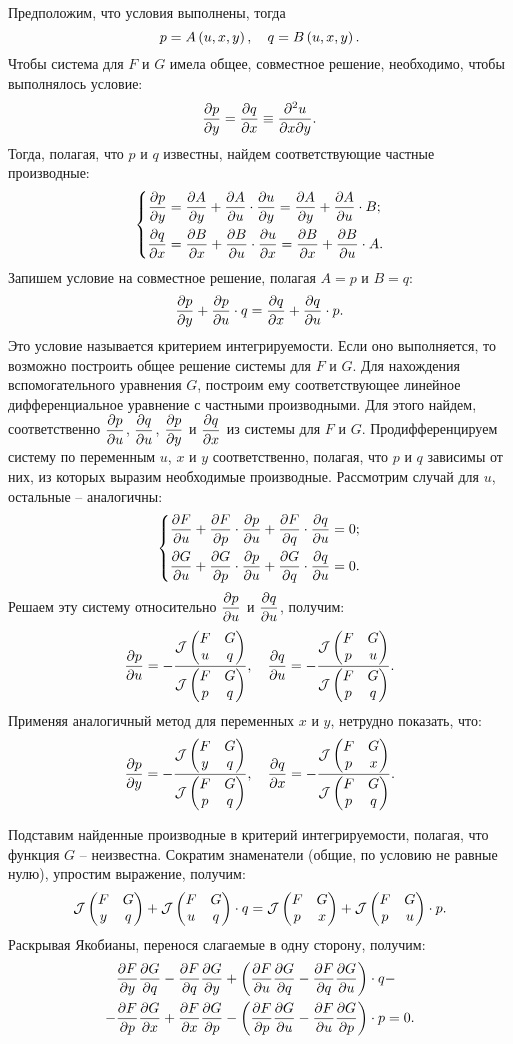 	Предположим, что условия выполнены, тогда
	\[ p = A \pares{u, x, y}, \quad q = B \pares{u, x, y}. \]
	Чтобы система для $F$ и $G$ имела общее, совместное решение, необходимо, чтобы выполнялось условие:
	\[ \dpart{p}{y} = \dpart{q}{x} \equiv \dpartmix{u}{x}{y}. \]
	Тогда, полагая, что $p$ и $q$ известны, найдем соответствующие частные производные:
	\[ \left\lbrace \begin{split} 
		\dpart{p}{y} &= \dpart{A}{y} + \dpart{A}{u} \cdot \dpart{u}{y} = \dpart{A}{y} + \dpart{A}{u} \cdot B; \\
		\dpart{q}{x} &= \dpart{B}{x} + \dpart{B}{u} \cdot \dpart{u}{x} = \dpart{B}{x} + \dpart{B}{u} \cdot A.
	\end{split} \right. \]
	Запишем условие на совместное решение, полагая $A = p$ и $B = q$:
	\[ \dpart{p}{y} + \dpart{p}{u} \cdot q = \dpart{q}{x} + \dpart{q}{u} \cdot p. \]
	Это условие называется критерием интегрируемости. Если оно выполняется, то возможно построить общее решение системы для $F$ и $G$. Для нахождения вспомогательного уравнения $G$, построим ему соответствующее линейное дифференциальное уравнение с частными производными. Для этого найдем, соответственно $\dpart{p}{u}$, $\dpart{q}{u}$, $\dpart{p}{y}$ и $\dpart{q}{x}$ из системы для $F$ и $G$. Продифференцируем систему по переменным $u$, $x$ и $y$ соответственно, полагая, что $p$ и $q$ зависимы от них, из которых выразим необходимые производные. Рассмотрим случай для $u$, остальные -- аналогичны: 
	\[ \left\lbrace \begin{split} 
		\dpart{F}{u} + \dpart{F}{p} \cdot \dpart{p}{u} + \dpart{F}{q} \cdot \dpart{q}{u} &= 0; \\
		\dpart{G}{u} + \dpart{G}{p} \cdot \dpart{p}{u} + \dpart{G}{q} \cdot \dpart{q}{u} &= 0.
	\end{split} \right. \]
	Решаем эту систему относительно $\dpart{p}{u}$ и $\dpart{q}{u}$, получим:
	\[ \dpart{p}{u} = -\frac{\jac{F & G}{u & q}}{\jac{F & G}{p & q}}, \quad \dpart{q}{u} = -\frac{\jac{F & G}{p & u}}{\jac{F & G}{p & q}}. \]
	Применяя аналогичный метод для переменных $x$ и $y$, нетрудно показать, что:
	\[ \dpart{p}{y} = -\frac{\jac{F & G}{y & q}}{\jac{F & G}{p & q}}, \quad \dpart{q}{x} = -\frac{\jac{F & G}{p & x}}{\jac{F & G}{p & q}}. \]

	Подставим найденные производные в критерий интегрируемости, полагая, что функция $G$ -- неизвестна. Сократим знаменатели (общие, по условию не равные нулю), упростим выражение, получим:
	\[ \jac{F & G}{y & q} + \jac{F & G}{u & q} \cdot q = \jac{F & G}{p & x} + \jac{F & G}{p & u} \cdot p. \]
	Раскрывая Якобианы, перенося слагаемые в одну сторону, получим:
	\[ \begin{split}
		&\dpart{F}{y} \dpart{G}{q} - \dpart{F}{q} \dpart{G}{y} 
		+ \pares{ \dpart{F}{u} \dpart{G}{q} - \dpart{F}{q} \dpart{G}{u} } \cdot q - \\
		- &\dpart{F}{p} \dpart{G}{x} + \dpart{F}{x} \dpart{G}{p} 
		- \pares{ \dpart{F}{p} \dpart{G}{u} - \dpart{F}{u} \dpart{G}{p} } \cdot p = 0.
	\end{split} \]

